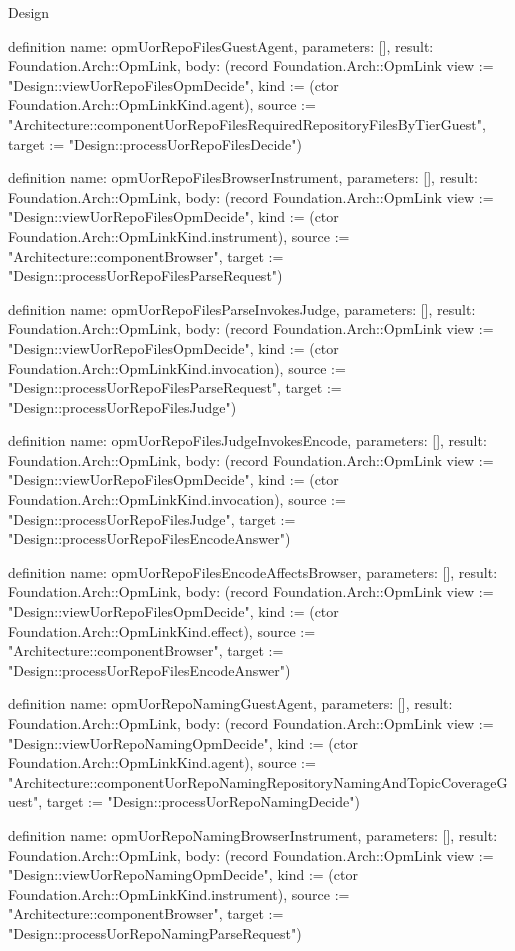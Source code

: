\begin{lexlean}{Design}
\begin{semanticmodule}
definition{
  name: opmUorRepoFilesGuestAgent,
  parameters: [],
  result: Foundation.Arch::OpmLink,
  body: (record Foundation.Arch::OpmLink {view := "Design::viewUorRepoFilesOpmDecide", kind := (ctor Foundation.Arch::OpmLinkKind.agent), source := "Architecture::componentUorRepoFilesRequiredRepositoryFilesByTierGuest", target := "Design::processUorRepoFilesDecide"})
}

definition{
  name: opmUorRepoFilesBrowserInstrument,
  parameters: [],
  result: Foundation.Arch::OpmLink,
  body: (record Foundation.Arch::OpmLink {view := "Design::viewUorRepoFilesOpmDecide", kind := (ctor Foundation.Arch::OpmLinkKind.instrument), source := "Architecture::componentBrowser", target := "Design::processUorRepoFilesParseRequest"})
}

definition{
  name: opmUorRepoFilesParseInvokesJudge,
  parameters: [],
  result: Foundation.Arch::OpmLink,
  body: (record Foundation.Arch::OpmLink {view := "Design::viewUorRepoFilesOpmDecide", kind := (ctor Foundation.Arch::OpmLinkKind.invocation), source := "Design::processUorRepoFilesParseRequest", target := "Design::processUorRepoFilesJudge"})
}

definition{
  name: opmUorRepoFilesJudgeInvokesEncode,
  parameters: [],
  result: Foundation.Arch::OpmLink,
  body: (record Foundation.Arch::OpmLink {view := "Design::viewUorRepoFilesOpmDecide", kind := (ctor Foundation.Arch::OpmLinkKind.invocation), source := "Design::processUorRepoFilesJudge", target := "Design::processUorRepoFilesEncodeAnswer"})
}

definition{
  name: opmUorRepoFilesEncodeAffectsBrowser,
  parameters: [],
  result: Foundation.Arch::OpmLink,
  body: (record Foundation.Arch::OpmLink {view := "Design::viewUorRepoFilesOpmDecide", kind := (ctor Foundation.Arch::OpmLinkKind.effect), source := "Architecture::componentBrowser", target := "Design::processUorRepoFilesEncodeAnswer"})
}

definition{
  name: opmUorRepoNamingGuestAgent,
  parameters: [],
  result: Foundation.Arch::OpmLink,
  body: (record Foundation.Arch::OpmLink {view := "Design::viewUorRepoNamingOpmDecide", kind := (ctor Foundation.Arch::OpmLinkKind.agent), source := "Architecture::componentUorRepoNamingRepositoryNamingAndTopicCoverageGuest", target := "Design::processUorRepoNamingDecide"})
}

definition{
  name: opmUorRepoNamingBrowserInstrument,
  parameters: [],
  result: Foundation.Arch::OpmLink,
  body: (record Foundation.Arch::OpmLink {view := "Design::viewUorRepoNamingOpmDecide", kind := (ctor Foundation.Arch::OpmLinkKind.instrument), source := "Architecture::componentBrowser", target := "Design::processUorRepoNamingParseRequest"})
}


\end{semanticmodule}
\end{lexlean}
